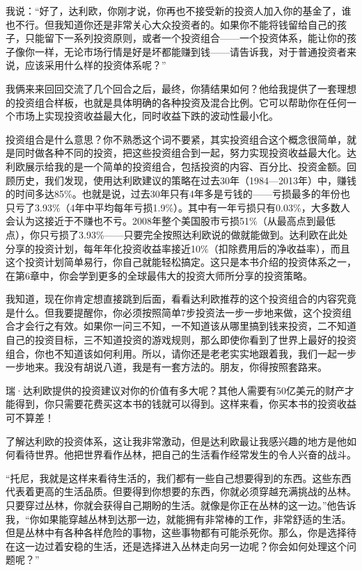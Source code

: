 我说：“好了，达利欧，你刚才说，你再也不接受新的投资人加入你的基金了，谁也不行。但我知道你还是非常关心大众投资者的。如果你不能将钱留给自己的孩子，只能留下一系列投资原则，或者一个投资组合——一个投资体系，能让你的孩子像你一样，无论市场行情是好是坏都能赚到钱——请告诉我，对于普通投资者来说，应该采用什么样的投资体系呢？”

我俩来来回回交流了几个回合之后，最终，你猜结果如何？他给我提供了一套理想的投资组合样板，也就是具体明确的各种投资及混合比例。它可以帮助你在任何一个市场上实现投资收益最大化，同时收益下跌的波动性最小化。

投资组合是什么意思？你不熟悉这个词不要紧，其实投资组合这个概念很简单，就是同时做各种不同的投资，把这些投资组合到一起，努力实现投资收益最大化。达利欧展示给我的是一个简单的投资组合，包括投资的内容、百分比、投资金额。回顾历史，我们发现，使用达利欧建议的策略在过去30年（1984—2013年）中，赚钱的时间多达85\%。也就是说，过去30年只有4年多是亏钱的——亏损最多的年份也只亏了3.93\%（4年中平均每年亏损1.9\%）。其中有一年亏损只有0.03\%，大多数人会认为这接近于不赚也不亏。2008年整个美国股市亏损51\%（从最高点到最低点），你只亏损了3.93\%——只要完全按照达利欧说的做就能做到。达利欧在此处分享的投资计划，每年年化投资收益率接近10\%（扣除费用后的净收益率），而且这个投资计划简单易行，你自己就能轻松搞定。这只是本书介绍的投资体系之一，在第6章中，你会学到更多的全球最伟大的投资大师所分享的投资策略。

我知道，现在你肯定想直接跳到后面，看看达利欧推荐的这个投资组合的内容究竟是什么。但我要提醒你，你必须按照简单7步投资法一步一步地来做，这个投资组合才会行之有效。如果你一问三不知，一不知道该从哪里搞到钱来投资，二不知道自己的投资目标，三不知道投资的游戏规则，那么即使你看到了世界上最好的投资组合，你也不知道该如何利用。所以，请你还是老老实实地跟着我，我们一起一步一步地来。我没有胡说八道，我是有一套方法的。朋友，你得按照套路来。

瑞·达利欧提供的投资建议对你的价值有多大呢？其他人需要有50亿美元的财产才能得到，你只需要花费买这本书的钱就可以得到。这样来看，你买本书的投资收益可不算差！

了解达利欧的投资体系，这让我非常激动，但是达利欧最让我感兴趣的地方是他如何看待世界。他把世界看作丛林，把自己的生活看作经常发生的令人兴奋的战斗。

“托尼，我就是这样来看待生活的，我们都有一些自己想要得到的东西。这些东西代表着更高的生活品质。但要得到你想要的东西，你就必须穿越充满挑战的丛林。只要穿过丛林，你就会获得自己期盼的生活。就像是你正在丛林的这一边。”他告诉我，“你如果能穿越丛林到达那一边，就能拥有非常棒的工作，非常舒适的生活。但是丛林中有各种各样危险的事物，这些事物都有可能杀死你。那么，你是选择待在这一边过着安稳的生活，还是选择进入丛林走向另一边呢？你会如何处理这个问题呢？”

